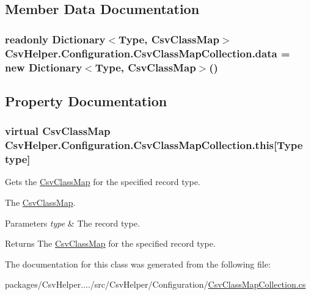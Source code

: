 \subsection{Member Data Documentation}
\hypertarget{a00042_a6402d0986ae539363780f34eefd5fa99}{
\subsubsection[{data}]{\setlength{\rightskip}{0pt plus 5cm}readonly Dictionary$<$Type, {\bf Csv\-Class\-Map}$>$ Csv\-Helper.\-Configuration.\-Csv\-Class\-Map\-Collection.\-data = new Dictionary$<$Type, {\bf Csv\-Class\-Map}$>$()\hspace{0.3cm}{\ttfamily [private]}}}\label{a00042_a6402d0986ae539363780f34eefd5fa99}


\subsection{Property Documentation}
\hypertarget{a00042_a58c95d5126b396fcf3f58d7daa59646e}{
\subsubsection[{this[Type type]}]{\setlength{\rightskip}{0pt plus 5cm}virtual {\bf Csv\-Class\-Map} Csv\-Helper.\-Configuration.\-Csv\-Class\-Map\-Collection.\-this\mbox{[}Type type\mbox{]}\hspace{0.3cm}{\ttfamily [get]}}}\label{a00042_a58c95d5126b396fcf3f58d7daa59646e}


Gets the \hyperlink{a00040}{Csv\-Class\-Map} for the specified record type. 

The \hyperlink{a00040}{Csv\-Class\-Map}. 


\begin{DoxyParams}{Parameters}
{\em type} & The record type.\\
\hline
\end{DoxyParams}
\begin{DoxyReturn}{Returns}
The \hyperlink{a00040}{Csv\-Class\-Map} for the specified record type.
\end{DoxyReturn}


The documentation for this class was generated from the following file\-:\begin{DoxyCompactItemize}
\item 
packages/\-Csv\-Helper..../src/\-Csv\-Helper/\-Configuration/\hyperlink{a00184}{Csv\-Class\-Map\-Collection.\-cs}\end{DoxyCompactItemize}
